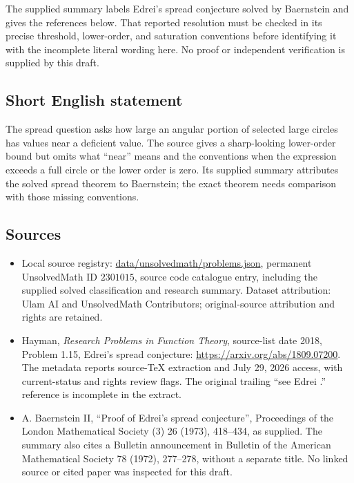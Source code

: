 \documentclass[11pt]{article}
\begin{document}
The supplied summary labels Edrei's spread conjecture solved by Baernstein and gives the references below. That reported resolution must be checked in its precise threshold, lower-order, and saturation conventions before identifying it with the incomplete literal wording here. No proof or independent verification is supplied by this draft.
\subsection{Short English statement}
The spread question asks how large an angular portion of selected large circles has values near a deficient value. The source gives a sharp-looking lower-order bound but omits what ``near'' means and the conventions when the expression exceeds a full circle or the lower order is zero. Its supplied summary attributes the solved spread theorem to Baernstein; the exact theorem needs comparison with those missing conventions.
\subsection{Sources}
\begin{itemize}
\item Local source registry: \url{data/unsolvedmath/problems.json}, permanent UnsolvedMath ID $2301015$, source code catalogue entry, including the supplied solved classification and research summary. Dataset attribution: Ulam AI and UnsolvedMath Contributors; original-source attribution and rights are retained.
\item Hayman, \emph{Research Problems in Function Theory}, source-list date 2018, Problem 1.15, Edrei's spread conjecture: \url{https://arxiv.org/abs/1809.07200}. The metadata reports source-TeX extraction and July 29, 2026 access, with current-status and rights review flags. The original trailing ``see Edrei .'' reference is incomplete in the extract.
\item A. Baernstein II, ``Proof of Edrei's spread conjecture'', Proceedings of the London Mathematical Society (3) 26 (1973), 418--434, as supplied. The summary also cites a Bulletin announcement in Bulletin of the American Mathematical Society 78 (1972), 277--278, without a separate title. No linked source or cited paper was inspected for this draft.
\end{itemize}
\end{document}
